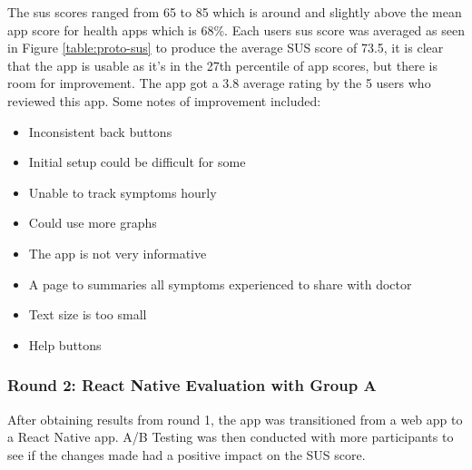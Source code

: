 The sus scores ranged from 65 to 85 which is around and slightly above the mean app score for health apps which is 68\%\cite{Hyzy2022}. Each users sus score was averaged as seen in Figure \ref{table:proto-sus} to produce the average SUS score of 73.5, it is clear that the app is usable as it's in the 27th percentile of app scores, but there is room for improvement. The app got a 3.8 average rating by the 5 users who reviewed this app. Some notes of improvement included:

\begin{itemize}
    \item Inconsistent back buttons
    \item Initial setup could be difficult for some 
    \item Unable to track symptoms hourly
    \item Could use more graphs
    \item The app is not very informative
    \item A page to summaries all symptoms experienced to share with doctor
    \item Text size is too small
    \item Help buttons
\end{itemize}


\subsubsection{Round 2: React Native Evaluation with Group A}
After obtaining results from round 1, the app was transitioned from a web app to a React Native app. A/B Testing was then conducted with more participants to see if the changes made had a positive impact on the SUS score. 

